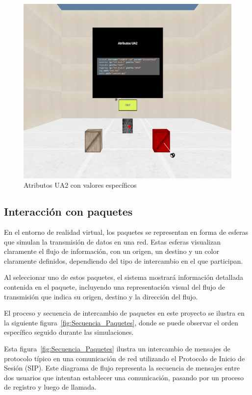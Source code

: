 \documentclass[a4paper, 12pt]{book}
\begin{document}
\begin{figure}
  \centering
  \includegraphics[width=12cm, keepaspectratio]{img/resultados/UA2_Iniciado.png}
  \caption{Atributos UA2 con valores específicos}
  \label{fig:UA2_Iniciado}
\end{figure}

\clearpage
\subsection{Interacción con paquetes}
\label{subsec:objeto_paquetes}
En el entorno de realidad virtual, los paquetes se representan en forma de esferas que simulan la transmisión de datos en una red. 
Estas esferas visualizan claramente el flujo de información, con un origen, un destino y un color claramente definidos, 
dependiendo del tipo de intercambio en el que participan.

\bigskip

Al seleccionar uno de estos paquetes, el sistema mostrará información detallada contenida en el paquete, 
incluyendo una representación visual del flujo de transmisión que indica su origen, destino y la dirección del flujo.

\bigskip

El proceso y secuencia de intercambio de paquetes en este proyecto se ilustra en la siguiente figura~\ref{fig:Secuencia_Paquetes}, donde se puede observar el orden 
específico seguido durante las simulaciones.

\bigskip

Esta figura~\ref{fig:Secuencia_Paquetes} ilustra un intercambio de mensajes de protocolo típico en una comunicación de red utilizando el Protocolo de Inicio de Sesión (SIP). 
Este diagrama de flujo representa la secuencia de mensajes entre dos usuarios que intentan establecer una comunicación, 
pasando por un proceso de registro y luego de llamada.
\end{document}
